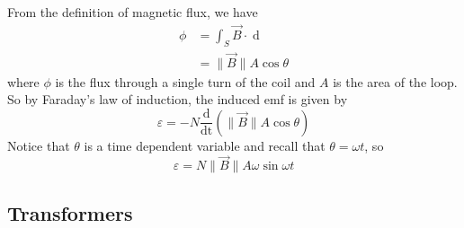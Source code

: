 From the definition of magnetic flux, we have
\begin{align}
    \phi &= \int_S \vec{B} \cdot \mathop{\mathrm{d}\vec{A}} \\
    &= \|\vec{B} \|A \cos \theta
\end{align}
where $\phi$ is the flux through a single turn of the coil and $A$ is the area of the loop. So by Faraday's law of induction, the induced emf is given by
\begin{equation}
    \varepsilon = -N \frac{\mathrm{d}}{\mathop{\mathrm{d}t}} \left(\|\vec{B} \|A \cos \theta\right)
\end{equation}
Notice that $\theta$ is a time dependent variable and recall that $\theta = \omega t$, so 
\begin{equation}
    \varepsilon = N \|\vec{B}\| A \omega \sin \omega t
\end{equation}


\subsection{Transformers}